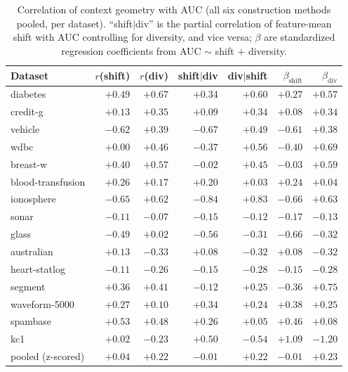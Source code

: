 \documentclass[11pt,a4paper]{article}
\begin{document}
\begin{table}[h]
\centering
\caption{Correlation of context geometry with AUC (all six construction methods
pooled, per dataset). ``shift$\mid$div'' is the partial correlation of
feature-mean shift with AUC controlling for diversity, and vice versa; $\beta$
are standardized regression coefficients from AUC $\sim$ shift $+$ diversity.}
\label{tab:partial}
\small
\begin{tabular}{lrrrrrr}
\toprule
Dataset & $r$(shift) & $r$(div) & shift$\mid$div & div$\mid$shift & $\beta_{\text{shift}}$ & $\beta_{\text{div}}$ \\
\midrule
diabetes           & $+0.49$ & $+0.67$ & $+0.34$ & $+0.60$ & $+0.27$ & $+0.57$ \\
credit-g           & $+0.13$ & $+0.35$ & $+0.09$ & $+0.34$ & $+0.08$ & $+0.34$ \\
vehicle            & $-0.62$ & $+0.39$ & $-0.67$ & $+0.49$ & $-0.61$ & $+0.38$ \\
wdbc               & $+0.00$ & $+0.46$ & $-0.37$ & $+0.56$ & $-0.40$ & $+0.69$ \\
breast-w           & $+0.40$ & $+0.57$ & $-0.02$ & $+0.45$ & $-0.03$ & $+0.59$ \\
blood-transfusion  & $+0.26$ & $+0.17$ & $+0.20$ & $+0.03$ & $+0.24$ & $+0.04$ \\
ionosphere         & $-0.65$ & $+0.62$ & $-0.84$ & $+0.83$ & $-0.66$ & $+0.63$ \\
sonar              & $-0.11$ & $-0.07$ & $-0.15$ & $-0.12$ & $-0.17$ & $-0.13$ \\
glass              & $-0.49$ & $+0.02$ & $-0.56$ & $-0.31$ & $-0.66$ & $-0.32$ \\
australian         & $+0.13$ & $-0.33$ & $+0.08$ & $-0.32$ & $+0.08$ & $-0.32$ \\
heart-statlog      & $-0.11$ & $-0.26$ & $-0.15$ & $-0.28$ & $-0.15$ & $-0.28$ \\
segment            & $+0.36$ & $+0.41$ & $-0.12$ & $+0.25$ & $-0.36$ & $+0.75$ \\
waveform-5000      & $+0.27$ & $+0.10$ & $+0.34$ & $+0.24$ & $+0.38$ & $+0.25$ \\
spambase           & $+0.53$ & $+0.48$ & $+0.26$ & $+0.05$ & $+0.46$ & $+0.08$ \\
kc1                & $+0.02$ & $-0.23$ & $+0.50$ & $-0.54$ & $+1.09$ & $-1.20$ \\
\midrule
pooled (z-scored)  & $+0.04$ & $+0.22$ & $-0.01$ & $+0.22$ & $-0.01$ & $+0.23$ \\
\bottomrule
\end{tabular}
\end{table}
\end{document}

